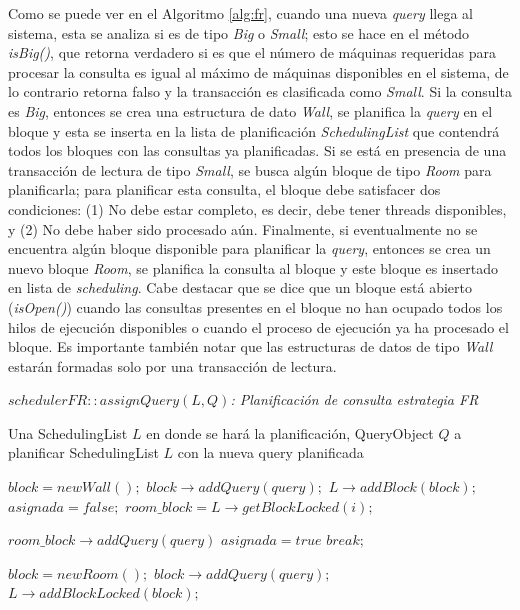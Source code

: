 Como se puede ver en el Algoritmo \ref{alg:fr}, cuando una nueva \textit{query} llega al sistema, esta se analiza si es de tipo \textit{Big} o \textit{Small}; esto se hace en el método \textit{isBig()}, que retorna verdadero si es que el número de máquinas requeridas para procesar la consulta es igual al máximo de máquinas disponibles en el sistema, de lo contrario retorna falso y la transacción es clasificada como \textit{Small}. Si la consulta es \textit{Big}, entonces se crea una estructura de dato \textit{Wall}, se planifica la \textit{query} en el bloque y esta se inserta en la lista de planificación \textit{SchedulingList} que contendrá todos los bloques con las consultas ya planificadas. Si se está en presencia de una transacción de lectura de tipo \textit{Small}, se busca algún bloque de tipo \textit{Room} para planificarla; para planificar esta consulta, el bloque debe satisfacer dos condiciones: (1) No debe estar completo, es decir, debe tener threads disponibles, y (2) No debe haber sido procesado aún. Finalmente, si eventualmente no se encuentra algún bloque disponible para planificar la \textit{query}, entonces se crea un nuevo bloque \textit{Room}, se planifica la consulta al bloque y este bloque es insertado en lista de \textit{scheduling}. Cabe destacar que se dice que un bloque está abierto (\textit{isOpen()}) cuando las consultas presentes en el bloque no han ocupado todos los hilos de ejecución disponibles o cuando el proceso de ejecución ya ha procesado el bloque. Es importante también notar que las estructuras de datos de tipo \textit{Wall} estarán formadas solo por una transacción de lectura.

\begin{algorithm}[!th]
\caption{\em $schedulerFR::assignQuery(L, Q)$: Planificación de consulta estrategia FR}
\label{alg:fr}
\begin{algorithmic}[1]
\REQUIRE Una SchedulingList $L$ en donde se hará la planificación, QueryObject $Q$ a planificar
\ENSURE SchedulingList $L$ con la nueva query planificada

	\STATE $block = new Wall();$
	\STATE $block \rightarrow addQuery(query);$
	\STATE $L \rightarrow addBlock(block);$
\ELSE
	\STATE $asignada = false;$
		\STATE $room\_block = L \rightarrow getBlockLocked(i);$
		
			\STATE $room\_block \rightarrow addQuery(query)$
			\STATE $asignada = true$
			\STATE $break;$
		\ENDIF
	\ENDFOR
	
		\STATE $block = new Room();$
		\STATE $block \rightarrow addQuery(query);$
		\STATE $L \rightarrow addBlockLocked(block);$		
	\ENDIF
\ENDIF

\end{algorithmic}
\end{algorithm}


